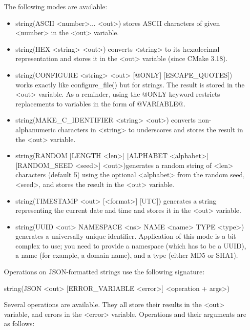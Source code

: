 
The following modes are available:

\begin{itemize}
\item
string(ASCII <number>... <out>) stores ASCII characters of given <number> in the <out> variable.

\item
string(HEX <string> <out>) converts <string> to its hexadecimal representation and stores it in the <out> variable (since CMake 3.18).

\item
string(CONFIGURE <string> <out> [@ONLY] [ESCAPE\_QUOTES]) works exactly like configure\_file() but for strings. The result is stored in the <out> variable. As a reminder, using the @ONLY keyword restricts replacements to variables in the form of @VARIABLE@.

\item
string(MAKE\_C\_IDENTIFIER <string> <out>) converts non-alphanumeric characters in <string> to underscores and stores the result in the <out> variable.

\item
string(RANDOM [LENGTH <len>] [ALPHABET <alphabet>] [RANDOM\_SEED <seed>] <out>)generates a random string of <len> characters (default 5) using the optional <alphabet> from the random seed, <seed>, and stores the result in the <out> variable.

\item
string(TIMESTAMP <out> [<format>] [UTC]) generates a string representing the current date and time and stores it in the <out> variable.

\item
string(UUID <out> NAMESPACE <ns> NAME <name> TYPE <type>) generates a universally unique identifier. Application of this mode is a bit complex to use; you need to provide a namespace (which has to be a UUID), a name (for example, a domain name), and a type (either MD5 or SHA1).
\end{itemize}


Operations on JSON-formatted strings use the following signature:

\begin{cmake}
string(JSON <out> [ERROR_VARIABLE <error>] <operation + args>)
\end{cmake}

Several operations are available. They all store their results in the <out> variable, and errors in the <error> variable. Operations and their arguments are as follows:

